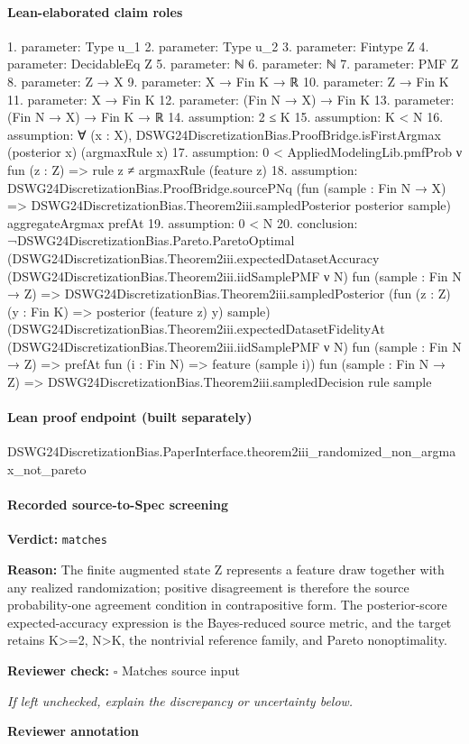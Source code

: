 \documentclass[10pt]{article}
\newcommand{\reviewerbox}{%
  \par\noindent\fbox{\parbox{0.96\linewidth}{\rule{0pt}{0.38in}}}\par
}
\newcommand{\reviewmatch}[1]{%
  \par\noindent\textbf{Reviewer check:} $\square$\; #1\par
  \noindent\emph{If left unchecked, explain the discrepancy or uncertainty below.}\par
}
\begin{document}
\paragraph{Lean-elaborated claim roles}\begin{ReviewVerbatim}
1. parameter: Type u_1
2. parameter: Type u_2
3. parameter: Fintype Z
4. parameter: DecidableEq Z
5. parameter: ℕ
6. parameter: ℕ
7. parameter: PMF Z
8. parameter: Z → X
9. parameter: X → Fin K → ℝ
10. parameter: Z → Fin K
11. parameter: X → Fin K
12. parameter: (Fin N → X) → Fin K
13. parameter: (Fin N → X) → Fin K → ℝ
14. assumption: 2 ≤ K
15. assumption: K < N
16. assumption: ∀ (x : X), DSWG24DiscretizationBias.ProofBridge.isFirstArgmax (posterior x) (argmaxRule x)
17. assumption: 0 < AppliedModelingLib.pmfProb ν fun (z : Z) => rule z ≠ argmaxRule (feature z)
18. assumption: DSWG24DiscretizationBias.ProofBridge.sourcePNq
  (fun (sample : Fin N → X) => DSWG24DiscretizationBias.Theorem2iii.sampledPosterior posterior sample) aggregateArgmax
  prefAt
19. assumption: 0 < N
20. conclusion: ¬DSWG24DiscretizationBias.Pareto.ParetoOptimal
    (DSWG24DiscretizationBias.Theorem2iii.expectedDatasetAccuracy
      (DSWG24DiscretizationBias.Theorem2iii.iidSamplePMF ν N) fun (sample : Fin N → Z) =>
      DSWG24DiscretizationBias.Theorem2iii.sampledPosterior (fun (z : Z) (y : Fin K) => posterior (feature z) y) sample)
    (DSWG24DiscretizationBias.Theorem2iii.expectedDatasetFidelityAt
      (DSWG24DiscretizationBias.Theorem2iii.iidSamplePMF ν N) fun (sample : Fin N → Z) =>
      prefAt fun (i : Fin N) => feature (sample i))
    fun (sample : Fin N → Z) => DSWG24DiscretizationBias.Theorem2iii.sampledDecision rule sample
\end{ReviewVerbatim}

\paragraph{Lean proof endpoint (built separately)}\begin{ReviewVerbatim}
DSWG24DiscretizationBias.PaperInterface.theorem2iii_randomized_non_argmax_not_pareto
\end{ReviewVerbatim}

\paragraph{Recorded source-to-Spec screening}
\textbf{Verdict:} \texttt{matches}
\\
{\raggedright
\textbf{Reason:} The finite augmented state Z represents a feature draw together with any realized randomization;\allowbreak{} positive disagreement is therefore the source probability-\allowbreak{}one agreement condition in contrapositive form.\allowbreak{} The posterior-\allowbreak{}score expected-\allowbreak{}accuracy expression is the Bayes-\allowbreak{}reduced source metric, and the target retains K>=2, N>K, the nontrivial reference family, and Pareto nonoptimality.\allowbreak{}
\par}
\reviewmatch{Matches source input}
\noindent\textbf{Reviewer annotation}\par
\reviewerbox
\clearpage
\hypertarget{source-claim-1356bc033e8e977b}{}
\end{document}
